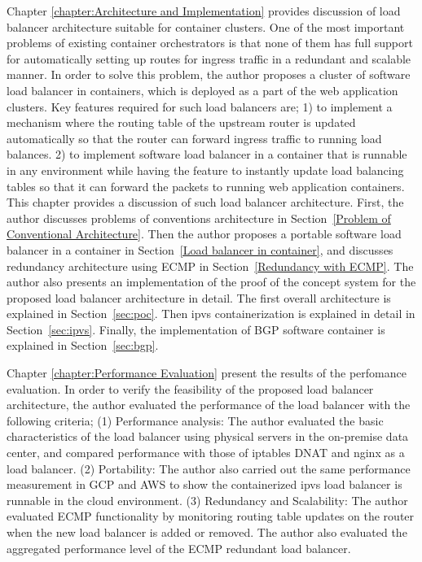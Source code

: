 Chapter \ref{chapter:Architecture and Implementation} provides discussion of load balancer architecture suitable for container clusters.
One of the most important problems of existing container orchestrators is that none of them has full support for automatically setting up routes for ingress traffic in a redundant and scalable manner.
In order to solve this problem, the author proposes a cluster of software load balancer in containers, which is deployed as a part of the web application clusters.
Key features required for such load balancers are;
1) to implement a mechanism where the routing table of the upstream router is updated automatically so that the router can forward ingress traffic to running load balances.
2) to implement software load balancer in a container that is runnable in any environment while having the feature to instantly update load balancing tables so that it can forward the packets to running web application containers.
This chapter provides a discussion of such load balancer architecture.
First, the author discusses problems of conventions architecture in Section~\ref{Problem of Conventional Architecture}.
Then the author proposes a portable software load balancer in a container in Section~\ref{Load balancer in container}, and discusses redundancy architecture using ECMP in Section~\ref{Redundancy with ECMP}.
%
The author also presents an implementation of the proof of the concept system for the proposed load balancer architecture in detail.
The first overall architecture is explained in Section~\ref{sec:poc}.
Then ipvs containerization is explained in detail in Section~\ref{sec:ipvs}.
Finally, the implementation of BGP software container is explained in Section~\ref{sec:bgp}.


Chapter \ref{chapter:Performance Evaluation} present the results of the perfomance evaluation.
In order to verify the feasibility of the proposed load balancer architecture, the author evaluated the performance of the load balancer with the following criteria;
(1) Performance analysis:
The author evaluated the basic characteristics of the load balancer using physical servers in the on-premise data center, and compared performance with those of iptables DNAT and nginx as a load balancer.
(2) Portability:
The author also carried out the same performance measurement in GCP and AWS to show the containerized ipvs load balancer is runnable in the cloud environment.
(3) Redundancy and Scalability:
The author evaluated ECMP functionality by monitoring routing table updates on the router when the new load balancer is added or removed.
The author also evaluated the aggregated performance level of the ECMP redundant load balancer.


